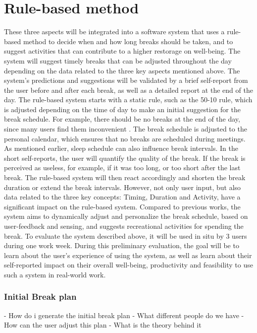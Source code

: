 \documentclass{hasel_thesis}
\begin{document}
\section{Rule-based method}
These three aspects will be integrated into a software system that uses a rule-based method to decide when and how long breaks should be taken, and to suggest activities that can contribute to a higher restorage on well-being. The system will suggest timely breaks that can be adjusted throughout the day depending on the data related to the three key aspects mentioned above. The system's predictions and suggestions will be validated by a brief self-report from the user before and after each break, as well as a detailed report at the end of the day.
The rule-based system starts with a static rule, such as the 50-10 rule, which is adjusted depending on the time of day to make an initial suggestion for the break schedule. For example, there should be no breaks at the end of the day, since many users find them inconvenient \cite{KimS.ParkY.&Niu.2017}. The break schedule is adjusted to the personal calendar, which ensures that no breaks are scheduled during meetings. As mentioned earlier, sleep schedule can also influence break intervals. In the short self-reports, the user will quantify the quality of the break. If the break is perceived as useless, for example, if it was too long, or too short after the last break. The rule-based system will then react accordingly and shorten the break duration or extend the break intervals. However, not only user input, but also data related to the three key concepts: Timing, Duration and Activity, have a significant impact on the rule-based system.
Compared to previous works, the system aims to dynamically adjust and personalize the break schedule, based on user-feedback and sensing, and suggests recreational activities for spending the break. 
To evaluate the system described above, it will be used in situ by 3 users during one work week. During this preliminary evaluation, the goal will be to learn about the user’s experience of using the system, as well as learn about their self-reported impact on their overall well-being, productivity and feasibility to use such a system in real-world work.

\subsubsection{Initial Break plan}
- How do i generate the initial break plan
- What different people do we have
- How can the user adjust this plan
- What is the theory behind it
\end{document}
